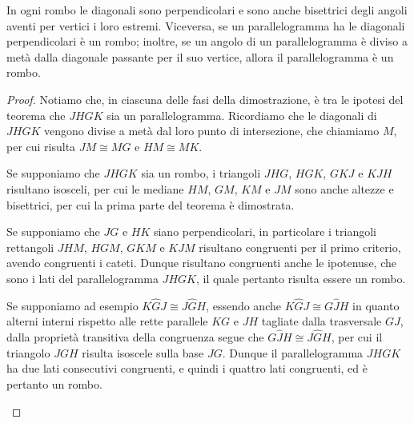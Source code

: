 \begin{teorema}
In ogni rombo le diagonali sono perpendicolari e sono anche 
bisettrici degli angoli aventi per vertici i loro estremi. Viceversa, 
se un parallelogramma ha le diagonali perpendicolari è un rombo; 
inoltre, se un angolo di un parallelogramma è diviso a metà dalla 
diagonale passante per il suo vertice, allora il parallelogramma è un 
rombo.
\end{teorema}


\begin{inaccessibleblock}
\begin{center}\end{center}
\end{inaccessibleblock}

\begin{proof}
Notiamo che, in ciascuna delle fasi della dimostrazione, è tra le 
ipotesi del teorema che \(JHGK\) sia un parallelogramma. Ricordiamo che 
le diagonali di \(JHGK\) vengono divise a metà dal loro punto di 
intersezione, che chiamiamo \(M\), per cui risulta \(JM\cong MG\) e 
\(HM\cong MK\).
\begin{enumeratea}
\item Se supponiamo che \(JHGK\) sia un rombo, i triangoli \(JHG\), 
\(HGK\), \(GKJ\) e \(KJH\) risultano isosceli, per cui le mediane \(HM\), 
\(GM\), \(KM\) e \(JM\) sono anche altezze e bisettrici, per cui la prima 
parte del teorema è dimostrata.
\item Se supponiamo che \(JG\) e \(HK\) siano perpendicolari, in 
particolare i triangoli rettangoli \(JHM\), \(HGM\), \(GKM\) e \(KJM\) 
risultano congruenti per il primo criterio, avendo congruenti i 
cateti. Dunque risultano congruenti anche le ipotenuse, che sono i 
lati del parallelogramma \(JHGK\), il quale pertanto risulta essere un 
rombo.
\item Se supponiamo ad esempio \(K\widehat{G}J\cong J\widehat{G}H\), 
essendo anche \(K\widehat{G}J\cong G\widehat{J}H\) in quanto alterni 
interni rispetto alle rette parallele \(KG\) e \(JH\) tagliate dalla 
trasversale \(GJ\), dalla proprietà transitiva della congruenza segue 
che \(G\widehat{J}H\cong J\widehat{G}H\), per cui il triangolo \(JGH\) 
risulta isoscele sulla base \(JG\). Dunque il parallelogramma \(JHGK\) ha 
due lati consecutivi congruenti, e quindi i quattro lati congruenti, 
ed è pertanto un rombo.
\end{enumeratea}
\end{proof}

